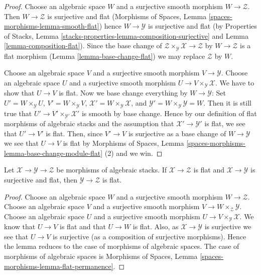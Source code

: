 \begin{proof}
Choose an algebraic space $W$ and a surjective smooth morphism
$W \to \mathcal{Z}$. Then $W \to \mathcal{Z}$ is surjective and flat
(Morphisms of Spaces, Lemma \ref{spaces-morphisms-lemma-smooth-flat})
hence $W \to \mathcal{Y}$ is surjective and flat (by
Properties of Stacks, Lemma
\ref{stacks-properties-lemma-composition-surjective}
and
Lemma \ref{lemma-composition-flat}).
Since the base change of
$\mathcal{Z} \times_\mathcal{Y} \mathcal{X} \to \mathcal{Z}$
by $W \to \mathcal{Z}$ is a flat morphism
(Lemma \ref{lemma-base-change-flat})
we may replace $\mathcal{Z}$ by $W$.

\medskip\noindent
Choose an algebraic space $V$ and a surjective smooth morphism
$V \to \mathcal{Y}$. Choose an algebraic space $U$ and a surjective
smooth morphism $U \to V \times_\mathcal{Y} \mathcal{X}$.
We have to show that $U \to V$ is flat. Now we base change
everything by $W \to \mathcal{Y}$: Set $U' = W \times_\mathcal{Y} U$,
$V' = W \times_\mathcal{Y} V$,
$\mathcal{X}' = W \times_\mathcal{Y} \mathcal{X}$,
and $\mathcal{Y}' = W \times_\mathcal{Y} \mathcal{Y} = W$.
Then it is still true that $U' \to V' \times_{\mathcal{Y}'} \mathcal{X}'$
is smooth by base change. Hence by our definition of flat morphisms
of algebraic stacks and the assumption that $\mathcal{X}' \to \mathcal{Y}'$
is flat, we see that $U' \to V'$ is flat. Then, since
$V' \to V$ is surjective as a base change of $W \to \mathcal{Y}$ we see
that $U \to V$ is flat by
Morphisms of Spaces, Lemma
\ref{spaces-morphisms-lemma-base-change-module-flat} (2)
and we win.
\end{proof}

\begin{lemma}
\label{lemma-flat-permanence}
Let $\mathcal{X} \to \mathcal{Y} \to \mathcal{Z}$ be morphisms of
algebraic stacks. If $\mathcal{X} \to \mathcal{Z}$ is flat
and $\mathcal{X} \to \mathcal{Y}$ is surjective and flat, then
$\mathcal{Y} \to \mathcal{Z}$ is flat.
\end{lemma}

\begin{proof}
Choose an algebraic space $W$ and a surjective smooth morphism
$W \to \mathcal{Z}$. Choose an algebraic space $V$ and a surjective smooth
morphism $V \to W \times_\mathcal{Z} \mathcal{Y}$. Choose an algebraic space
$U$ and a surjective smooth morphism $U \to V \times_\mathcal{Y} \mathcal{X}$.
We know that $U \to V$ is flat and that $U \to W$ is flat.
Also, as $\mathcal{X} \to \mathcal{Y}$ is surjective we see that
$U \to V$ is surjective (as a composition of surjective morphisms).
Hence the lemma reduces to the case of morphisms of algebraic spaces.
The case of morphisms of algebraic spaces is
Morphisms of Spaces, Lemma
\ref{spaces-morphisms-lemma-flat-permanence}.
\end{proof}

